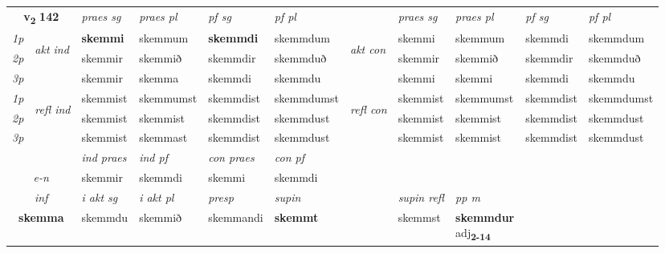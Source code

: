 \noindent
\begin{tabular}{lllllllllll} \toprule
\multicolumn{2}{c}{\textbf{v{\textsubscript{2}}} \Large{\textbf{142}}}  &  \textit{praes sg}  & \textit{praes pl}  &\textit{ pf sg} & \textit{pf pl} &  &  \textit{praes sg}  & \textit{praes pl}  & \textit{pf sg} & \textit{pf pl } \\*
	\cmidrule{3-6} \cmidrule{8-11}
 {\textit{1p}} & \multirow{3}{*}{\begin{turn}{90}\textit{akt ind}\end{turn}} & \textbf{skemmi} & skemmum & \textbf{skemmdi} & skemmdum & \multirow{3}{*}{\begin{turn}{90}\textit{akt con}\end{turn}} &skemmi & skemmum & skemmdi & skemmdum\\*
 {\textit{2p}} &  &  skemmir  & skemmið & skemmdir & skemmduð & & skemmir & skemmið & skemmdir & skemmduð \\*
{\textit{3p}} &  & skemmir & skemma & skemmdi & skemmdu & & skemmi & skemmi& skemmdi & skemmdu \\*
\cmidrule{3-6} \cmidrule{8-11}
 {\textit{1p}} & \multirow{3}{*}{\begin{turn}{90}\textit{refl ind}\end{turn}}  & skemmist & skemmumst & skemmdist & skemmdumst & \multirow{3}{*}{\begin{turn}{90}\textit{refl con}\end{turn}}  &skemmist & skemmumst & skemmdist & skemmdumst \\*
 {\textit{2p}} &  & skemmist & skemmist & skemmdist & skemmdust & &skemmist & skemmist & skemmdist & skemmdust \\*
 {\textit{3p}}  & & skemmist & skemmast & skemmdist & skemmdust & & skemmist & skemmist& skemmdist & skemmdust \\*
\cmidrule{3-6} \cmidrule{8-11}

   & &  \textit{ind praes} & \textit{ind pf} & \textit{con praes} & \textit{con pf} \\*
\multicolumn{2}{c}{ \textit{e-n} } & skemmir & skemmdi & skemmi & skemmdi \\*

\cmidrule{3-9}
   \multicolumn{2}{c}{\textit{inf}}  & \textit{i akt sg} & \textit{i akt pl}   & \textit{presp} & \textit{supin} && \textit{supin refl} & \textit{pp m} \\*
  \multicolumn{2}{c}{\textbf{skemma}} & skemmdu  & skemmið   & skemmandi &  \textbf{skemmt} && skemmst & \specialcell{\textbf{skemmdur} \\ adj\textbf{\textsubscript{2-14}}} \\*
\end{tabular}

